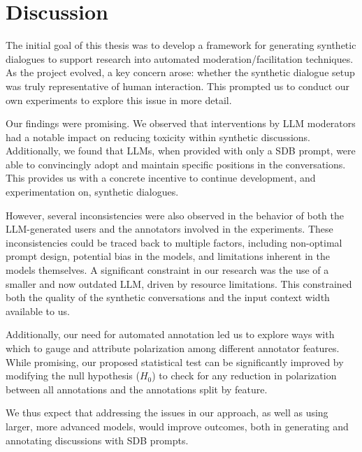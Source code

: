 %
\chapter{Discussion}
\label{sec:discusision}

The initial goal of this thesis was to develop a framework for generating synthetic dialogues to support research into automated moderation/facilitation techniques. As the project evolved, a key concern arose: whether the synthetic dialogue setup was truly representative of human interaction. This prompted us to conduct our own experiments to explore this issue in more detail.

Our findings were promising. We observed that interventions by LLM moderators had a notable impact on reducing toxicity within synthetic discussions. Additionally, we found that LLMs, when provided with only a \ac{SDB} prompt, were able to convincingly adopt and maintain specific positions in the conversations. This provides us with a concrete incentive to continue development, and experimentation on, synthetic dialogues.

However, several inconsistencies were also observed in the behavior of both the LLM-generated users and the annotators involved in the experiments. These inconsistencies could be traced back to multiple factors, including non-optimal prompt design, potential bias in the models, and limitations inherent in the models themselves. A significant constraint in our research was the use of a smaller and now outdated LLM, driven by resource limitations. This constrained both the quality of the synthetic conversations and the input context width available to us. 

Additionally, our need for automated annotation led us to explore ways with which to gauge and attribute polarization among different annotator features. While promising, our proposed statistical test can be significantly improved by modifying the null hypothesis ($H_0$) to check for any reduction in polarization between all annotations and the annotations split by feature.

We thus expect that addressing the issues in our approach, as well as using larger, more advanced models, would improve outcomes, both in generating and annotating discussions with \ac{SDB} prompts.